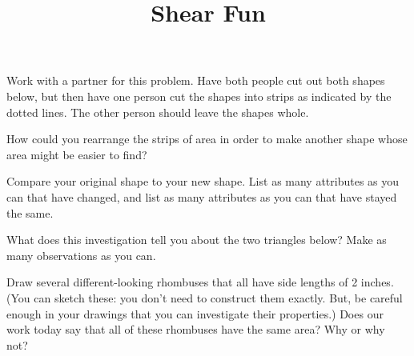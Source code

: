 \documentclass[nooutcomes,noauthor, handout]{ximera}
\title{Shear Fun}
\begin{document}
\begin{abstract}
\end{abstract}

\maketitle

\begin{problem}
Work with a partner for this problem. Have both people cut out both shapes below, but then have one person cut the shapes into strips as indicated by the dotted lines. The other person should leave the shapes whole.
\begin{center}
\end{center}

How could you rearrange the strips of area in order to make another shape whose area might be easier to find? 

\end{problem}


\begin{problem}
Compare your original shape to your new shape. List as many attributes as you can that have changed, and list as many attributes as you can that have stayed the same.
\end{problem}

\newpage

\begin{problem}
What does this investigation tell you about the two triangles below? Make as many observations as you can.
\begin{center}
\end{center}
\end{problem}

\begin{problem}
Draw several different-looking rhombuses that all have side lengths of 2 inches. (You can sketch these: you don't need to construct them exactly. But, be careful enough in your drawings that you can investigate their properties.)
\vskip 0.1in
Does our work today say that all of these rhombuses have the same area? Why or why not?
\end{problem}
\end{document}

